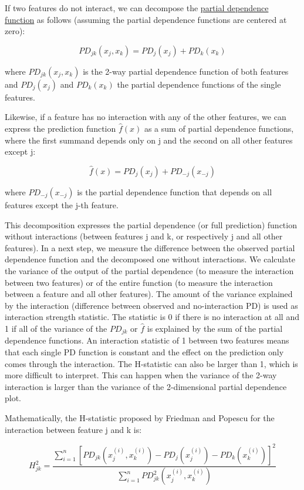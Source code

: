 \documentclass[
  12pt,
]{krantz}
\begin{document}
If two features do not interact, we can decompose the \protect\hyperlink{pdp}{partial dependence function} as follows (assuming the partial dependence functions are centered at zero):

\[PD_{jk}(x_j,x_k)=PD_j(x_j)+PD_k(x_k)\]

where \(PD_{jk}(x_j,x_k)\) is the 2-way partial dependence function of both features and \(PD_j(x_j)\) and \(PD_k(x_k)\) the partial dependence functions of the single features.

Likewise, if a feature has no interaction with any of the other features, we can express the prediction function \(\hat{f}(x)\) as a sum of partial dependence functions, where the first summand depends only on j and the second on all other features except j:

\[\hat{f}(x)=PD_j(x_j)+PD_{-j}(x_{-j})\]

where \(PD_{-j}(x_{-j})\) is the partial dependence function that depends on all features except the j-th feature.

This decomposition expresses the partial dependence (or full prediction) function without interactions (between features j and k, or respectively j and all other features).
In a next step, we measure the difference between the observed partial dependence function and the decomposed one without interactions.
We calculate the variance of the output of the partial dependence (to measure the interaction between two features) or of the entire function (to measure the interaction between a feature and all other features).
The amount of the variance explained by the interaction (difference between observed and no-interaction PD) is used as interaction strength statistic.
The statistic is 0 if there is no interaction at all and 1 if all of the variance of the \(PD_{jk}\) or \(\hat{f}\) is explained by the sum of the partial dependence functions.
An interaction statistic of 1 between two features means that each single PD function is constant and the effect on the prediction only comes through the interaction.
The H-statistic can also be larger than 1, which is more difficult to interpret.
This can happen when the variance of the 2-way interaction is larger than the variance of the 2-dimensional partial dependence plot.

Mathematically, the H-statistic proposed by Friedman and Popescu for the interaction between feature j and k is:

\[H^2_{jk} = \frac{\sum_{i=1}^n\left[PD_{jk}(x_{j}^{(i)},x_k^{(i)})-PD_j(x_j^{(i)}) - PD_k(x_{k}^{(i)})\right]^2}{\sum_{i=1}^n{PD}^2_{jk}(x_j^{(i)},x_k^{(i)})}\]
\end{document}
